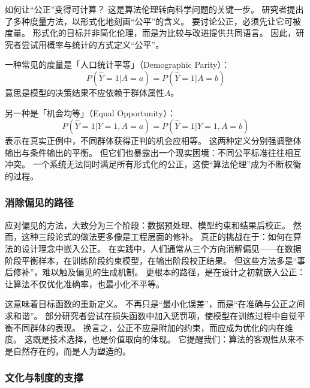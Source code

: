 如何让“公正”变得可计算？  
这是算法伦理转向科学问题的关键一步。  
研究者提出了多种度量方法，以形式化地刻画“公平”的含义。  
要讨论公正，必须先让它可被度量。  
形式化的目标并非简化伦理，而是为比较与改进提供共同语言。  
因此，研究者尝试用概率与统计的方式定义“公平”。

一种常见的度量是「人口统计平等」（Demographic Parity）：  
\begin{equation}
P(\hat{Y}=1|A=a) = P(\hat{Y}=1|A=b)
\end{equation}
意思是模型的决策结果不应依赖于群体属性$A$。  

另一种是「机会均等」（Equal Opportunity）：  
\begin{equation}
P(\hat{Y}=1|Y=1, A=a) = P(\hat{Y}=1|Y=1, A=b)
\end{equation}
表示在真实正例中，不同群体获得正判的机会应相等。  
这两种定义分别强调整体输出与条件输出的平衡。  
但它们也暴露出一个现实困境：不同公平标准往往相互冲突。  
一个系统无法同时满足所有形式化的公正，这使“算法伦理”成为不断权衡的过程。

\subsubsection{消除偏见的路径}

应对偏见的方法，大致分为三个阶段：数据预处理、模型约束和结果后校正。  
然而，这种三段论式的做法更多像是工程层面的修补。  
真正的挑战在于：如何在算法的设计理念中嵌入公正。  
在实践中，人们通常从三个方向消解偏见——在数据阶段平衡样本，在训练阶段约束模型，在输出阶段校正结果。  
但这些方法多是“事后修补”，难以触及偏见的生成机制。  
更根本的路径，是在设计之初就嵌入公正：让算法不仅优化准确率，也最小化不平等。

这意味着目标函数的重新定义。  
不再只是“最小化误差”，而是“在准确与公正之间求和谐”。  
部分研究者尝试在损失函数中加入惩罚项，使模型在训练过程中自觉平衡不同群体的表现。  
换言之，公正不应是附加的约束，而应成为优化的内在维度。  
这既是技术选择，也是价值取向的体现。  
它提醒我们：算法的客观性从来不是自然存在的，而是人为塑造的。

\subsubsection{文化与制度的支撑}

